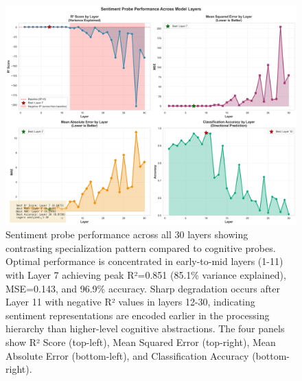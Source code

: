 \documentclass[letterpaper]{article}
\begin{document}
\begin{figure}[t]
\centering
\includegraphics[width=\textwidth]{../data/sentiment_probe_performance.png}
\caption{Sentiment probe performance across all 30 layers showing contrasting specialization pattern compared to cognitive probes. Optimal performance is concentrated in early-to-mid layers (1-11) with Layer 7 achieving peak R²=0.851 (85.1\% variance explained), MSE=0.143, and 96.9\% accuracy. Sharp degradation occurs after Layer 11 with negative R² values in layers 12-30, indicating sentiment representations are encoded earlier in the processing hierarchy than higher-level cognitive abstractions. The four panels show R² Score (top-left), Mean Squared Error (top-right), Mean Absolute Error (bottom-left), and Classification Accuracy (bottom-right).}
\label{fig:sentiment_performance}
\end{figure}
\end{document}

